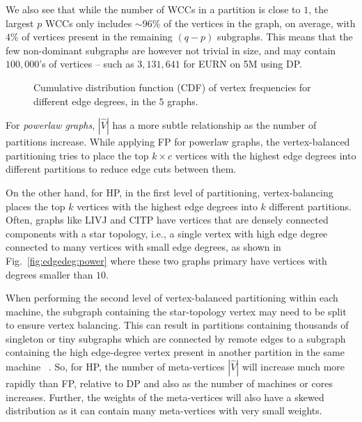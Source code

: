\documentclass[10pt,conference, compsocconf]{IEEEtran}
\begin{document}
We also see that while the number of WCCs in a partition is close to $1$, the largest $p$ WCCs only includes $\sim96\%$ of the vertices in the graph, on average, with $4\%$ of vertices present in the remaining $(q-p)$ subgraphs. This means that the few non-dominant subgraphs are however not trivial in size, and may contain $100,000$'s of vertices -- such as $3,131,641$ for EURN on 5M using DP.

\begin{figure*}[t!]
\vspace{-0.1in}
\centering {}
\caption{Cumulative distribution function (CDF) of vertex frequencies for different edge degrees, in the $5$ graphs.}
\label{fig:edgedeg}
\vspace{-0.1in}
\end{figure*}

For \emph{powerlaw graphs}, $|\widehat{V}|$ has a more subtle relationship as the number of partitions increase.
While applying FP for powerlaw graphs, the vertex-balanced partitioning tries to place the top $k \times c$ vertices with the highest edge degrees into different partitions to reduce edge cuts between them. 

On the other hand, for HP, in the first level of partitioning, vertex-balancing places the top $k$ vertices with the highest edge degrees into $k$ different partitions. Often, graphs like LIVJ and CITP have vertices that are densely connected components with a star topology, i.e., a single vertex with high edge degree connected to many vertices with small edge degrees, as shown in Fig.~\ref{fig:edgedeg:power} where these two graphs primary have vertices with degrees smaller than $10$. 

When performing the second level of vertex-balanced partitioning within each machine, the subgraph containing the star-topology vertex may need to be split to ensure vertex balancing.  This can result in partitions containing thousands of singleton or tiny subgraphs which are connected by remote edges to a subgraph containing the high edge-degree vertex present in another partition in the same machine ~\cite{lim2015discovering}. So, for HP, the number of meta-vertices $|\widehat{V}|$ will increase much more rapidly than FP, relative to DP and also as the number of machines or cores increases. Further, the weights of the meta-vertices will also have a skewed distribution as it can contain many meta-vertices with very small weights.
\end{document}
